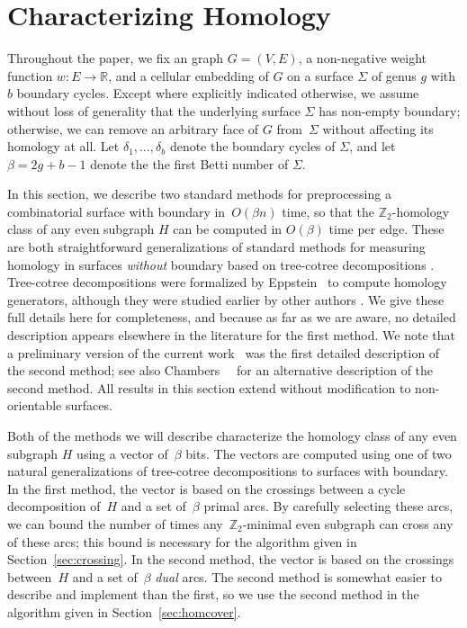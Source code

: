 \documentclass[letterpaper,review]{siamart190516}
\def\Z{\mathbb{Z}}
\def\Real{\mathbb{R}}
\begin{document}
\section{Characterizing Homology}
\label{S:tree-cotree}

Throughout the paper, we fix an  graph $G=(V,E)$, a non-negative weight function $w\colon E\to \Real$, and a cellular embedding of $G$ on a surface $\Sigma$ of genus $g$ with $b$ boundary cycles.
Except where explicitly indicated otherwise, we assume without loss of generality  that the underlying surface $\Sigma$ has non-empty boundary; otherwise, we can remove an arbitrary face of $G$ from~$\Sigma$ without affecting its homology at all.  Let $\delta_1, \dots, \delta_b$ denote the boundary cycles of $\Sigma$, and let $\beta = 2g+b-1$ denote the the first Betti number of $\Sigma$.

In this section, we describe two standard methods for preprocessing a combinatorial surface with boundary in~$O(\beta n)$ time, so that the $\Z_2$-homology class of any even subgraph $H$ can be computed in $O(\beta)$ time per edge.  These are both straightforward generalizations of standard methods for measuring homology in surfaces \emph{without} boundary based on tree-cotree decompositions \cite{ew-gohhg-05, ccelw-scsih-08, e-dgteg-03}.
Tree-cotree decompositions were formalized by Eppstein~\cite{e-dgteg-03} to compute homology generators, although they were studied earlier by other authors \cite{b-stdg-71, rs-cseg-84, tr-gctts-98}.
We give these full details here for completeness, and because as far as we are aware, no detailed description appears
elsewhere in the literature for the first method.  We note that a preliminary version of the current
work~\cite{en-mcsnc-11} was the first detailed description of the second method;
see also Chambers~\etal~\cite{bcfn-mchbs-17} for an alternative description of the second method.
All results in this section extend without modification to non-orientable surfaces.


Both of the methods we will describe characterize the homology class of any even subgraph $H$ using a vector of~$\beta$ bits.
The vectors are computed using one of two natural generalizations of tree-cotree decompositions  to surfaces with boundary.
In the first method, the vector is based on the crossings between a cycle decomposition of~$H$ and a set of~$\beta$ primal arcs.
By carefully selecting these arcs, we can bound the number of times any~$\Z_2$-minimal even subgraph can cross any of these arcs; this bound is necessary for the algorithm given in Section~\ref{sec:crossing}.
In the second method, the vector is based on the crossings between~$H$ and a set of~$\beta$ \emph{dual} arcs.
The second method is somewhat easier to describe and implement than the first, so we use the second method in the algorithm given in Section~\ref{sec:homcover}.
\end{document}
